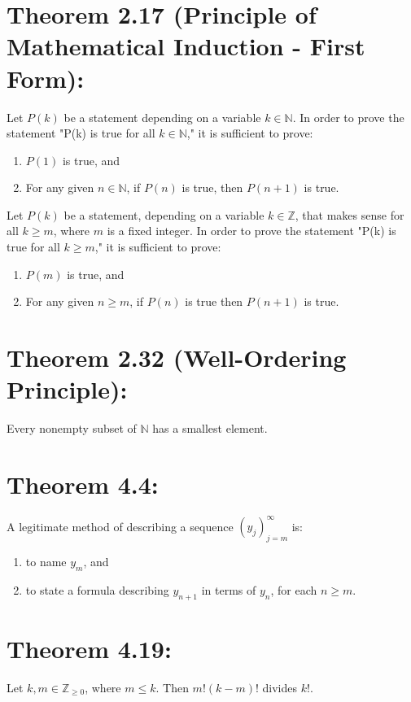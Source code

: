 \section*{Theorem 2.17 (Principle of Mathematical Induction - First Form):}
Let $P(k)$ be a statement depending on a variable $k \in \mathbb{N}$. In order to prove the statement "P(k) is true for all $k \in \mathbb{N}$," it is sufficient to prove:
\begin{enumerate}
    \item $P(1)$ is true, and
    \item For any given $n \in \mathbb{N}$, if $P(n)$ is true, then $P(n+1)$ is true.
\end{enumerate}

Let $P(k)$ be a statement, depending on a variable $k \in \mathbb{Z}$, that makes sense for all $k \geq m$, where $m$ is a fixed integer. In order to prove the statement "P(k) is true for all $k \geq m$," it is sufficient to prove:
\begin{enumerate}
    \item $P(m)$ is true, and
    \item For any given $n \geq m$, if $P(n)$ is true then $P(n+1)$ is true.
\end{enumerate}

\section*{Theorem 2.32 (Well-Ordering Principle):}
Every nonempty subset of $\mathbb{N}$ has a smallest element.

\section*{Theorem 4.4:}
A legitimate method of describing a sequence $(y_j)_{j=m}^{\infty}$ is:
\begin{enumerate}
    \item to name $y_m$, and
    \item to state a formula describing $y_{n+1}$ in terms of $y_n$, for each $n \geq m$.
\end{enumerate}

\section*{Theorem 4.19:}
Let $k,m \in \mathbb{Z}_{\geq 0}$, where $m \leq k$. Then $m!(k-m)!$ divides $k!$.


